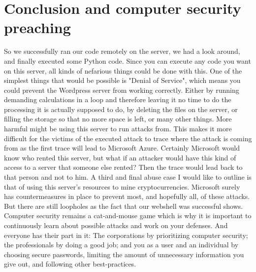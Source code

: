 \documentclass[12pt, a4paper]{article}
\begin{document}
	\section{Conclusion and computer security preaching}
		So we successfully ran our code remotely on the server, we had a look around, and finally executed some Python code. Since you can execute any code you want on this server, all kinds of nefarious things could be done with this. One of the simplest things that would be possible is "Denial of Service", which means you could prevent the Wordpress server from working correctly. Either by running demanding calculations in a loop and therefore leaving it no time to do the processing it is actually supposed to do, by deleting the files on the server, or filling the storage so that no more space is left, or many other things. More harmful might be using this server to run attacks from. This makes it more difficult for the victims of the executed attack to trace where the attack is coming from as the first trace will lead to Microsoft Azure. Certainly Microsoft would know who rented this server, but what if an attacker would have this kind of access to a server that someone else rented? Then the trace would lead back to that person and not to him. A third and final abuse case I would like to outline is that of using this server's resources to mine cryptocurrencies. Microsoft surely has countermeasures in place to prevent most, and hopefully all, of these attacks. But there are still loopholes as the fact that our webshell was successful shows. Computer security remains a cat-and-mouse game which is why it is important to continuously learn about possible attacks and work on your defenses. And everyone has their part in it: The corporations by prioritizing computer security; the professionals by doing a good job; and you as a user and an individual by choosing secure passwords, limiting the amount of unnecessary information you give out, and following other best-practices.
\end{document}
